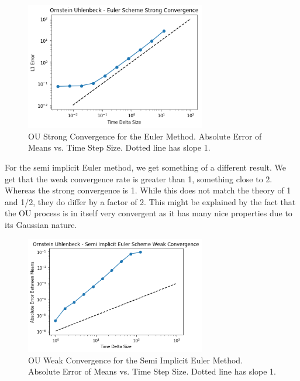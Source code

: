 \documentclass[notitlepage,pra,10pt,aps]{revtex4-2}
\begin{document}
  \begin{figure}[H]
    \centering
      \includegraphics[width=0.7\textwidth]{ou_strong_euler.png}
    \caption{OU Strong Convergence for the Euler Method. Absolute Error of Means vs. Time Step Size. Dotted line has slope 1.}
  \end{figure}

  For the semi implicit Euler method, we get something of a different result. We get that the weak convergence rate is greater than 1, something close to 2. Whereas the strong convergence is 1. While this does not match the theory of 1 and 1/2, they do differ by a factor of 2. This might be explained by the fact that the OU process is in itself very convergent as it has many nice properties due to its Gaussian nature.

  \begin{figure}[H]
    \centering
      \includegraphics[width=0.7\textwidth]{ou_weak_semi.png}
    \caption{OU Weak Convergence for the Semi Implicit Euler Method. Absolute Error of Means vs. Time Step Size. Dotted line has slope 1.}
  \end{figure}
\end{document}
